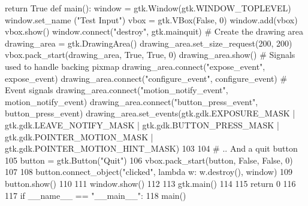 return True
def main():
window = gtk.Window(gtk.WINDOW_TOPLEVEL)
window.set_name ("Test Input")
vbox = gtk.VBox(False, 0)
window.add(vbox)
vbox.show()
window.connect("destroy", gtk.mainquit)
# Create the drawing area
drawing_area = gtk.DrawingArea()
drawing_area.set_size_request(200, 200)
vbox.pack_start(drawing_area, True, True, 0)
drawing_area.show()
# Signals used to handle backing pixmap
drawing_area.connect("expose_event", expose_event)
drawing_area.connect("configure_event", configure_event)
# Event signals
drawing_area.connect("motion_notify_event", motion_notify_event)
drawing_area.connect("button_press_event", button_press_event)
drawing_area.set_events(gtk.gdk.EXPOSURE_MASK
| gtk.gdk.LEAVE_NOTIFY_MASK
| gtk.gdk.BUTTON_PRESS_MASK
| gtk.gdk.POINTER_MOTION_MASK
| gtk.gdk.POINTER_MOTION_HINT_MASK)
103
104
# .. And a quit button
105
button = gtk.Button("Quit")
106
vbox.pack_start(button, False, False, 0)
107
108
button.connect_object("clicked", lambda w: w.destroy(), window)
109
button.show()
110
111
window.show()
112
113
gtk.main()
114
115
return 0
116
117 if __name__ == "__main__":
118
main()

